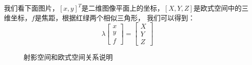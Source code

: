 \documentclass[12pt]{article}
\begin{document}
我们看下面图片，$[x,y]^T$是二维图像平面上的坐标，$[X,Y,Z]$是欧式空间中的三维坐标，$f$是焦距，根据红绿两个相似三角形，
我们可以得到：
\begin{equation}
    \lambda\left[\begin{array}{l}
        x \\
        y \\
        f
        \end{array}\right]=\left[\begin{array}{l}
        X \\
        Y \\
        Z
        \end{array}\right]
\end{equation}

\begin{figure}[ht]
    \centering
    \caption{射影空间和欧式空间关系说明}
    \label{fig:sy}
\end{figure}
\end{document}
